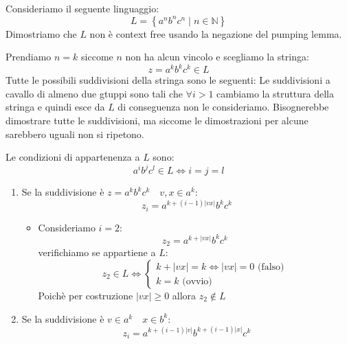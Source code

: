 \documentclass[a4paper]{article}
\begin{document}
\begin{example}
  Consideriamo il seguente linguaggio:
  \[
    L = \left\{ a^n b^n c^n \;\left|\; n \in \mathbb{N} \right. \right\}
  \] 
  Dimostriamo che \( L \) non è context free usando la negazione del pumping lemma.

  Prendiamo \( n = k \) siccome \( n \) non ha alcun vincolo e scegliamo la stringa:
  \[
    z = a^k b^k c^k \in L
  \] 
  Tutte le possibili suddivisioni della stringa sono le seguenti:
  \label{04-11-D8}
  Le suddivisioni a cavallo di almeno due gtuppi sono tali che \( \forall i > 1 \) cambiamo
  la struttura della stringa e quindi esce da \( L \) di conseguenza non le consideriamo.
  Bisognerebbe dimostrare tutte le suddivisioni, ma siccome le dimostrazioni per alcune
  sarebbero uguali non si ripetono.

  \vspace{1em}
  \noindent
  Le condizioni di appartenenza a \( L \) sono:
  \[
    a^i b^j c^l \in L \iff i = j = l
  \] 

  \begin{enumerate}
    \item Se la suddivisione è \( z = a^k b^k c^k \quad v,x \in a^k \):
      \[
        z_i = a^{k + (i-1) \left| v x \right|} b^k c^k
      \] 
      \begin{itemize}
        \item Consideriamo \( i = 2 \):
          \[
            z_2 = a^{k + \left| v x \right|} b^k c^k
          \]
          verifichiamo se appartiene a \( L \):
          \[
            z_2 \in L \iff
            \begin{cases}
              k + \left| v x \right| = k \iff \left| v x \right| = 0 \text{ (falso)}\\
              k = k \text{ (ovvio)}
            \end{cases}
          \] 
          Poichè per costruzione \( \left| v x \right| \ge 0 \) allora \( z_2 \notin L \)
      \end{itemize}

    \item Se la suddivisione è \( v \in a^k \quad x \in b^k \):
      \[
        z_i = a^{k + (i-1) \left| v \right|} b^{k + (i-1) \left| x \right|} c^k
      \]


\end{enumerate}
\end{example}
\end{document}
